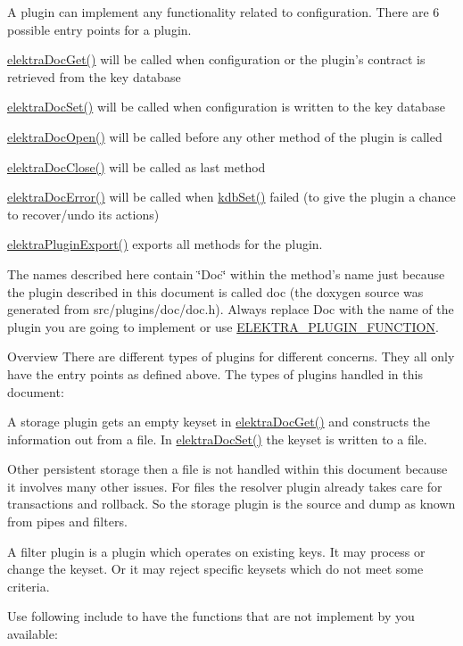 A plugin can implement any functionality related to configuration. There are 6 possible entry points for a plugin.
\begin{DoxyItemize}
\item \hyperlink{group__plugin_gacb69f3441c6d84241b4362f958fbe313}{elektra\-Doc\-Get()} will be called when configuration or the plugin's contract is retrieved from the key database
\item \hyperlink{group__plugin_gae65781a1deb34efc79c8cb9d9174842c}{elektra\-Doc\-Set()} will be called when configuration is written to the key database
\item \hyperlink{group__plugin_ga23c2eb3584e38a4d494eb8f91e5e3d8d}{elektra\-Doc\-Open()} will be called before any other method of the plugin is called
\item \hyperlink{group__plugin_ga1236aefe5b2baf8b7bf636ba5aa9ea29}{elektra\-Doc\-Close()} will be called as last method
\item \hyperlink{group__plugin_gad74b35f558ac7c3262f6069c5c47dc79}{elektra\-Doc\-Error()} will be called when \hyperlink{group__kdb_ga11436b058408f83d303ca5e996832bcf}{kdb\-Set()} failed (to give the plugin a chance to recover/undo its actions)
\item \hyperlink{group__plugin_ga8dd092048e972a3f0c9c9f54eb41576e}{elektra\-Plugin\-Export()} exports all methods for the plugin.
\end{DoxyItemize}

The names described here contain \char`\"{}\-Doc\char`\"{} within the method's name just because the plugin described in this document is called doc (the doxygen source was generated from src/plugins/doc/doc.\-h). Always replace Doc with the name of the plugin you are going to implement or use \hyperlink{group__plugin_ga34d1a66f0a6e89cfd20f4014a9975a2a}{E\-L\-E\-K\-T\-R\-A\-\_\-\-P\-L\-U\-G\-I\-N\-\_\-\-F\-U\-N\-C\-T\-I\-O\-N}.

\begin{DoxyParagraph}{Overview}
There are different types of plugins for different concerns. They all only have the entry points as defined above. The types of plugins handled in this document\-:
\begin{DoxyItemize}
\item A storage plugin gets an empty keyset in \hyperlink{group__plugin_gacb69f3441c6d84241b4362f958fbe313}{elektra\-Doc\-Get()} and constructs the information out from a file. In \hyperlink{group__plugin_gae65781a1deb34efc79c8cb9d9174842c}{elektra\-Doc\-Set()} the keyset is written to a file. \par
 Other persistent storage then a file is not handled within this document because it involves many other issues. For files the resolver plugin already takes care for transactions and rollback. So the storage plugin is the source and dump as known from pipes and filters.
\item A filter plugin is a plugin which operates on existing keys. It may process or change the keyset. Or it may reject specific keysets which do not meet some criteria.
\end{DoxyItemize}
\end{DoxyParagraph}
Use following include to have the functions that are not implement by you available\-:


